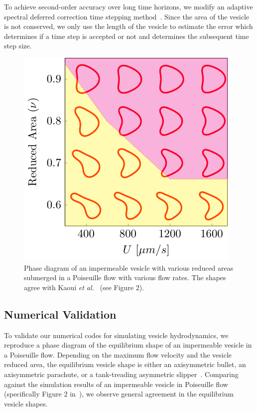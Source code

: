 \documentclass[prb,preprint,showpacs,preprintnumbers,amsmath,amssymb,longbibliography]{revtex4-1}
\newif\ifTikz
\begin{document}
To achieve second-order accuracy over long time horizons, we modify an
adaptive spectral deferred correction time stepping
method~\cite{qua-bir2016}. Since the area of the vesicle is not
conserved, we only use the length of the vesicle to estimate the error
which determines if a time step is accepted or not and determines the
subsequent time step size.

\begin{figure}[htp]
  \centering
  \ifTikz
  
  \else
  \includegraphics{figures/parabolicImpermeable.pdf}
  \fi
  \caption{\label{fig:PoiseuillePhase} Phase diagram of an impermeable
  vesicle with various reduced areas submerged in a Poiseuille flow with
  various flow rates. The shapes agree with Kaoui {\em et
  al.}~\cite{kao-bir-mis2009} (see Figure 2).}
\end{figure}

\subsection{Numerical Validation\label{subsec:numerical_validation}}
To validate our numerical codes for simulating vesicle hydrodynamics, we
reproduce a phase diagram of the equilibrium shape of an impermeable
vesicle in a Poiseuille flow. Depending on the maximum flow velocity and
the vesicle reduced area, the equilibrium vesicle shape is either an
axisymmetric bullet, an axisymmetric parachute, or a tank-treading
asymmetric slipper~\cite{kao-bir-mis2009}. Comparing against the
simulation results of an impermeable vesicle in Poiseuille flow
(specifically Figure 2 in~\citet{kao-bir-mis2009}), we observe general
agreement in the equilibrium vesicle shapes.
\end{document}
